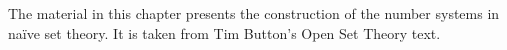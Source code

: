 \documentclass[../../../include/open-logic-section]{subfiles}
\begin{document}
	

\begin{editorial}
The material in this chapter presents the construction of the number
systems in na\"ive set theory. It is taken from Tim Button's Open Set
Theory text.
\end{editorial}


\OLEndChapterHook
\end{document}
